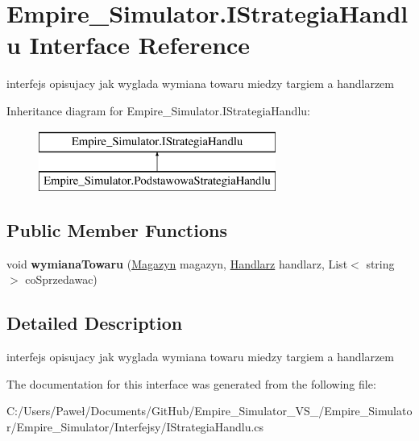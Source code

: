 \hypertarget{interface_empire___simulator_1_1_i_strategia_handlu}{\section{Empire\+\_\+\+Simulator.\+I\+Strategia\+Handlu Interface Reference}
\label{interface_empire___simulator_1_1_i_strategia_handlu}
}


interfejs opisujacy jak wyglada wymiana towaru miedzy targiem a handlarzem  


Inheritance diagram for Empire\+\_\+\+Simulator.\+I\+Strategia\+Handlu\+:\begin{figure}[H]
\begin{center}
\leavevmode
\includegraphics[height=2.000000cm]{interface_empire___simulator_1_1_i_strategia_handlu}
\end{center}
\end{figure}
\subsection*{Public Member Functions}
\begin{DoxyCompactItemize}
\item 
\hypertarget{interface_empire___simulator_1_1_i_strategia_handlu_a100f40aae9533b6f4301c3a839fe28c6}{void {\bfseries wymiana\+Towaru} (\hyperlink{class_empire___simulator_1_1_magazyn}{Magazyn} magazyn, \hyperlink{class_empire___simulator_1_1_handlarz}{Handlarz} handlarz, List$<$ string $>$ co\+Sprzedawac)}\label{interface_empire___simulator_1_1_i_strategia_handlu_a100f40aae9533b6f4301c3a839fe28c6}

\end{DoxyCompactItemize}


\subsection{Detailed Description}
interfejs opisujacy jak wyglada wymiana towaru miedzy targiem a handlarzem 



The documentation for this interface was generated from the following file\+:\begin{DoxyCompactItemize}
\item 
C\+:/\+Users/\+Paweł/\+Documents/\+Git\+Hub/\+Empire\+\_\+\+Simulator\+\_\+\+V\+S\+\_/\+Empire\+\_\+\+Simulator/\+Empire\+\_\+\+Simulator/\+Interfejsy/I\+Strategia\+Handlu.\+cs\end{DoxyCompactItemize}
